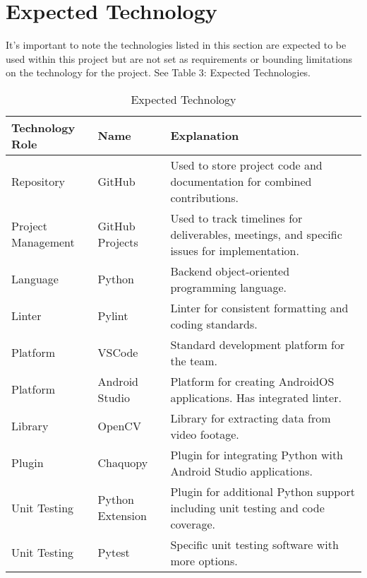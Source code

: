 \documentclass{article}
\begin{document}
\section{Expected Technology}

It’s important to note the technologies listed in this section are expected to be used within this project but are not set as requirements or bounding limitations on the technology for the project. See Table 3: Expected Technologies.

\begin{table}[hp]
\caption{Expected Technology} \label{Projected Technologies}
\begin{tabular}{ll|m{5cm}}
\textbf{Technology Role} & \textbf{Name}    & \textbf{Explanation}                                                                        \\ \hline
Repository               & GitHub           & Used to store project code and documentation for combined contributions.                    \\ \hline
Project Management       & GitHub Projects  & Used to track timelines for deliverables, meetings, and specific issues for implementation. \\ \hline
Language                 & Python           & Backend object-oriented programming language.                                               \\ \hline
Linter                   & Pylint           & Linter for consistent formatting and coding standards.                                      \\ \hline
Platform                 & VSCode           & Standard development platform for the team.                                                 \\ \hline
Platform                 & Android Studio   & Platform for creating AndroidOS applications. Has integrated linter.                        \\ \hline
Library                  & OpenCV           & Library for extracting data from video footage.                                             \\ \hline
Plugin                   & Chaquopy         & Plugin for integrating Python with Android Studio applications.                             \\ \hline
Unit Testing             & Python Extension & Plugin for additional Python support including unit testing and code coverage.              \\ \hline
Unit Testing             & Pytest           & Specific unit testing software with more options.
\end{tabular}
\end{table}
\end{document}
